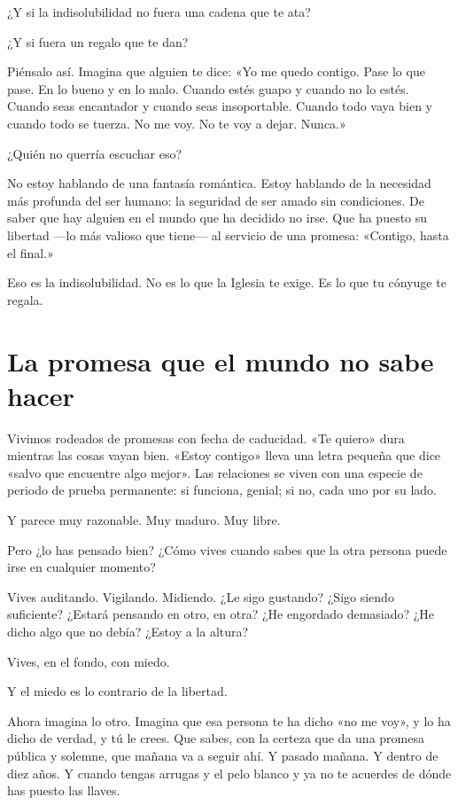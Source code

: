 ¿Y si la indisolubilidad no fuera una cadena que te ata?

¿Y si fuera un regalo que te dan?

Piénsalo así. Imagina que alguien te dice: «Yo me quedo contigo. Pase lo que pase. En lo bueno y en lo malo. Cuando estés guapo y cuando no lo estés. Cuando seas encantador y cuando seas insoportable. Cuando todo vaya bien y cuando todo se tuerza. No me voy. No te voy a dejar. Nunca.»

¿Quién no querría escuchar eso?

No estoy hablando de una fantasía romántica. Estoy hablando de la necesidad más profunda del ser humano: la seguridad de ser amado sin condiciones. De saber que hay alguien en el mundo que ha decidido no irse. Que ha puesto su libertad ---lo más valioso que tiene--- al servicio de una promesa: «Contigo, hasta el final.»

Eso es la indisolubilidad. No es lo que la Iglesia te exige. Es lo que tu cónyuge te regala.

\section{La promesa que el mundo no sabe hacer}

Vivimos rodeados de promesas con fecha de caducidad. «Te quiero» dura mientras las cosas vayan bien. «Estoy contigo» lleva una letra pequeña que dice «salvo que encuentre algo mejor». Las relaciones se viven con una especie de periodo de prueba permanente: si funciona, genial; si no, cada uno por su lado.

Y parece muy razonable. Muy maduro. Muy libre.

Pero ¿lo has pensado bien? ¿Cómo vives cuando sabes que la otra persona puede irse en cualquier momento?

Vives auditando. Vigilando. Midiendo. ¿Le sigo gustando? ¿Sigo siendo suficiente? ¿Estará pensando en otro, en otra? ¿He engordado demasiado? ¿He dicho algo que no debía? ¿Estoy a la altura?

Vives, en el fondo, con miedo.

Y el miedo es lo contrario de la libertad.

Ahora imagina lo otro. Imagina que esa persona te ha dicho «no me voy», y lo ha dicho de verdad, y tú le crees. Que sabes, con la certeza que da una promesa pública y solemne, que mañana va a seguir ahí. Y pasado mañana. Y dentro de diez años. Y cuando tengas arrugas y el pelo blanco y ya no te acuerdes de dónde has puesto las llaves.

